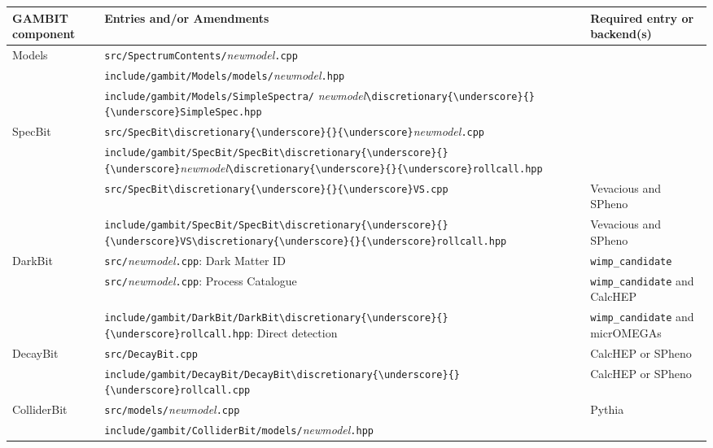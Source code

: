 \documentclass[pdftex,twocolumn,epjc3_preprint,runningheads]{svjour3}
\renewcommand{\_}{\discretionary{\underscore}{}{\underscore}}
\newcommand\term[1]{{\lstset{style=terminal}\lstinline!#1!\lstset{style=cpp}}}
\newcommand\guminline[1]{{{\lstset{style=gum}\lstinline!#1!}}}
\newcommand{\metavarf}[1]{\textit{\color{darkgreen}\footnotesize\textrm{#1}}}
\newcommand{\metavar}{\metavarf}
\newcommand{\gambit}{\textsf{GAMBIT}\xspace}
\newcommand{\darkbit}{\textsf{DarkBit}\xspace}
\newcommand{\colliderbit}{\textsf{ColliderBit}\xspace}
\newcommand{\specbit}{\textsf{SpecBit}\xspace}
\newcommand{\decaybit}{\textsf{DecayBit}\xspace}
\newcommand{\GB}{\gambit}
\newcommand{\pythia}{\textsf{Pythia}\xspace}
\newcommand{\micromegas}{\textsf{micrOMEGAs}\xspace}
\newcommand{\dgum}{\!\!\term{.gum}\!\xspace}
\newcommand{\CH}{\textsf{CalcHEP}\xspace}
\newcommand{\veva}{\textsf{Vevacious}\xspace}
\newcommand{\spheno}{\textsf{SPheno}\xspace}
\newcommand{\nm}{\metavar{new\_model}}
\begin{document}
\begin{table*}[tpb]
  \centering
  \begin{tabular}{p{1.8cm} p{9.5cm} p{4.6cm}}
    \toprule
    \GB component     & Entries and/or Amendments                                                    &  Required \dgum entry \newline or backend(s)\\
    \midrule
    Models            & \term{src/SpectrumContents/}\nm\term{.cpp}                            &  \\
                      & \term{include/gambit/Models/models/}\nm\term{.hpp}                    &  \\
                      & \term{include/gambit/Models/SimpleSpectra/}
                      \newline\hphantom{,} \nm\term{\_SimpleSpec.hpp} &  \\
    \midrule
    \specbit          & \term{src/SpecBit\_}\nm\term{.cpp}                                    &  \\
                      & \term{include/gambit/SpecBit/SpecBit\_}\nm\term{\_rollcall.hpp}       &  \\
                      & \term{src/SpecBit\_VS.cpp}                                            & \veva and \spheno \\
                      & \term{include/gambit/SpecBit/SpecBit\_VS\_rollcall.hpp}               & \veva and \spheno  \\
    \midrule
    \darkbit          & \term{src/}\nm\term{.cpp}: Dark Matter ID                             & \guminline{wimp_candidate} \\
                      & \term{src/}\nm\term{.cpp}: Process Catalogue                            & \guminline{wimp_candidate} and \CH  \\
                      & \term{include/gambit/DarkBit/DarkBit\_rollcall.hpp}: Direct detection & \guminline{wimp_candidate} and \micromegas \\
    \midrule
    \decaybit          & \term{src/DecayBit.cpp}                                              & \CH or \spheno \\
                      & \term{include/gambit/DecayBit/DecayBit\_rollcall.cpp}                & \CH or \spheno \\
    \midrule
    \colliderbit      & \term{src/models/}\nm\term{.cpp}                                     & %
    \pythia \\
                      & \term{include/gambit/ColliderBit/models/}\nm\term{.hpp}              & %

\end{tabular}
\end{table*}
\end{document}
